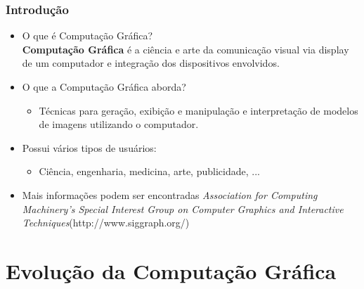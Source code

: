 \documentclass{beamer}
\begin{document}
\begin{frame}
\frametitle{Introdução}

\begin{block}


\begin{itemize}
	
	\item<1-> O que é Computação Gráfica?\\
		\textbf{Computação Gráfica} é a ciência e arte da comunicação visual via display de um computador e integração dos dispositivos envolvidos.
	\item<2-> O que a Computação Gráfica aborda?\\
		\begin{itemize}
			\item<3-> Técnicas para geração, exibição e manipulação e interpretação de modelos de imagens utilizando o computador.
		\end{itemize}
	\item<3-> Possui vários tipos de usuários:
		\begin{itemize}
			\item Ciência, engenharia, medicina, arte, publicidade, ...
		\end{itemize}
	\item<4-> Mais informações podem ser encontradas \textit{Association for Computing Machinery’s Special Interest Group on Computer Graphics and Interactive Techniques}(http://www.siggraph.org/)

\end{itemize}
\end{block}
\end{frame}



\section{Evolução da Computação Gráfica}
\end{document}
